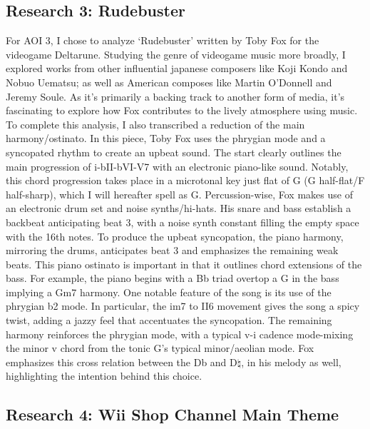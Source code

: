 \documentclass[11pt,a4paper]{article}
\begin{document}
\subsection{Research 3: Rudebuster}

For AOI 3, I chose to analyze ‘Rudebuster’ written by Toby Fox for the videogame Deltarune. Studying the genre of videogame music more broadly, I explored works from other influential japanese composers like Koji Kondo and Nobuo Uematsu; as well as American composes like Martin O'Donnell and Jeremy Soule. As it's primarily a backing track to another form of media, it's fascinating to explore how Fox contributes to the lively atmosphere using music. To complete this analysis, I also transcribed a reduction of the main harmony/ostinato.
In this piece, Toby Fox uses the phrygian mode and a syncopated rhythm to create an upbeat sound. The start clearly outlines the main progression of i-bII-bVI-V7 with an electronic piano-like sound. Notably, this chord progression takes place in a microtonal key just flat of G (G half-flat/F half-sharp), which I will hereafter spell as G. Percussion-wise, Fox makes use of an electronic drum set and noise synths/hi-hats. His snare and bass establish a backbeat anticipating beat 3, with a noise synth constant filling the empty space with the 16th notes. To produce the upbeat syncopation, the piano harmony, mirroring the drums, anticipates beat 3 and emphasizes the remaining weak beats. This piano ostinato is important in that it outlines chord extensions of the bass. For example, the piano begins with a Bb triad overtop a G in the bass implying a Gm7 harmony.
One notable feature of the song is its use of the phrygian b2 mode. In particular, the im7 to II6 movement gives the song a spicy twist, adding a jazzy feel that accentuates the syncopation. The remaining harmony reinforces the phrygian mode, with a typical v-i cadence mode-mixing the minor v chord from the tonic G’s typical minor/aeolian mode. Fox emphasizes this cross relation between the Db and D$\natural$, in his melody as well, highlighting the intention behind this choice.\autocite{rudebuster}

\subsection{Research 4: Wii Shop Channel Main Theme}
\end{document}
